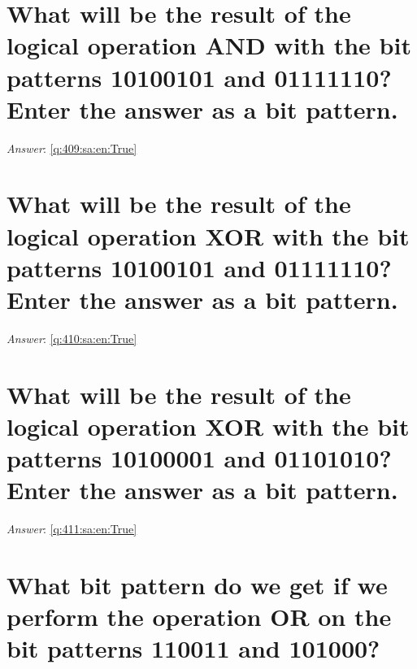 \documentclass[a4paper,11pt,oneside]{book}
\begin{document}
\begin{sloppypar}
\section{What will be the result of the logical operation AND with the bit patterns 10100101 and 01111110? Enter the answer as a bit pattern.}

\label{q:409:sa:en:False}

\vspace{2cm}

\noindent\makebox[\textwidth]{\hrulefill}

\vspace{1cm}

\textit{Answer}: \autoref{q:409:sa:en:True}



\section{What will be the result of the logical operation XOR with the bit patterns 10100101 and 01111110? Enter the answer as a bit pattern.}

\label{q:410:sa:en:False}

\vspace{2cm}

\noindent\makebox[\textwidth]{\hrulefill}

\vspace{1cm}

\textit{Answer}: \autoref{q:410:sa:en:True}



\section{What will be the result of the logical operation XOR with the bit patterns 10100001 and 01101010? Enter the answer as a bit pattern.}

\label{q:411:sa:en:False}

\vspace{2cm}

\noindent\makebox[\textwidth]{\hrulefill}

\vspace{1cm}

\textit{Answer}: \autoref{q:411:sa:en:True}



\section{What bit pattern do we get if we perform the operation OR on the bit patterns 110011 and 101000?}


\end{sloppypar}
\end{document}
